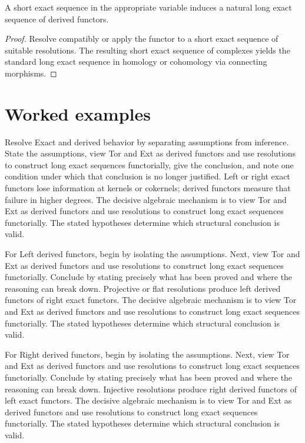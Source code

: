 \begin{theorem}\label{thm:v28-03}
A short exact sequence in the appropriate variable induces a natural long exact sequence of derived functors.
\begin{proof}
Resolve compatibly or apply the functor to a short exact sequence of suitable resolutions. The resulting short exact sequence of complexes yields the standard long exact sequence in homology or cohomology via connecting morphisms.
\end{proof}
\end{theorem}

\section{Worked examples}

\begin{example}\label{ex:v28-worked-01}
Resolve Exact and derived behavior by separating assumptions from inference. State the assumptions, view Tor and Ext as derived functors and use resolutions to construct long exact sequences functorially, give the conclusion, and note one condition under which that conclusion is no longer justified. Left or right exact functors lose information at kernels or cokernels; derived functors measure that failure in higher degrees. The decisive algebraic mechanism is to view Tor and Ext as derived functors and use resolutions to construct long exact sequences functorially. The stated hypotheses determine which structural conclusion is valid.
\end{example}

\begin{example}\label{ex:v28-worked-02}
For Left derived functors, begin by isolating the assumptions. Next, view Tor and Ext as derived functors and use resolutions to construct long exact sequences functorially. Conclude by stating precisely what has been proved and where the reasoning can break down. Projective or flat resolutions produce left derived functors of right exact functors. The decisive algebraic mechanism is to view Tor and Ext as derived functors and use resolutions to construct long exact sequences functorially. The stated hypotheses determine which structural conclusion is valid.
\end{example}

\begin{example}\label{ex:v28-worked-03}
For Right derived functors, begin by isolating the assumptions. Next, view Tor and Ext as derived functors and use resolutions to construct long exact sequences functorially. Conclude by stating precisely what has been proved and where the reasoning can break down. Injective resolutions produce right derived functors of left exact functors. The decisive algebraic mechanism is to view Tor and Ext as derived functors and use resolutions to construct long exact sequences functorially. The stated hypotheses determine which structural conclusion is valid.
\end{example}

